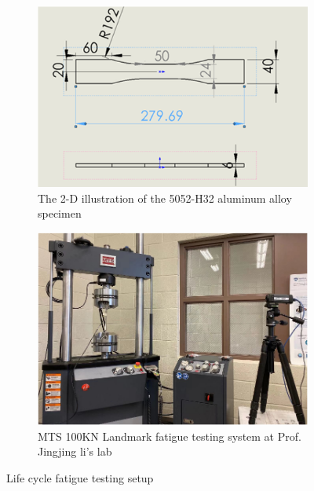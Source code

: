 \begin{figure}[tb]
  \begin{subfigure}[t]{0.50\linewidth}
    \includegraphics[height=0.7\textwidth]{fig/specimen_dim.png}
    \caption{The 2-D illustration of the 5052-H32 aluminum alloy specimen}
    \label{fig: specimen dim}
  \end{subfigure}
  \begin{subfigure}[t]{0.50\linewidth}
    \includegraphics[height=0.7\textwidth]{fig/fatigue_testing_machine.png}
    \caption{MTS 100KN Landmark fatigue testing system at Prof. Jingjing li's lab}
    \label{fig: fatigue testing machine}
  \end{subfigure}

  \caption{Life cycle fatigue testing setup}
  \label{fig: fatigue testing setup}
\end{figure}

